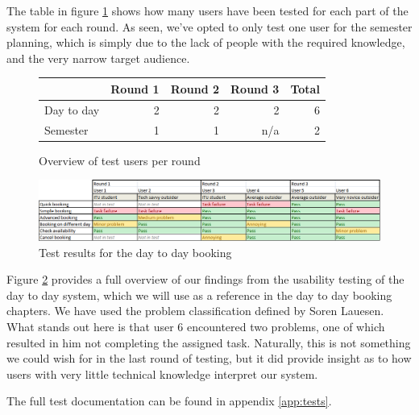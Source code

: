 The table in figure \ref{fig:usa_users} shows how many users have been tested for each part of the system for each round. As seen, we've opted to only test one user for the semester planning, which is simply due to the lack of people with the required knowledge, and the very narrow target audience.

\begin{figure}[htb]
\begin{center}
\leavevmode
	\begin{tabular}{|l|r|r|r||r|}
		\hline
		 & Round 1 & Round 2 & Round 3 & Total \\ \hline
		Day to day & 2 & 2 & 2 & 6\\ \hline
		Semester & 1 & 1 & n/a & 2 \\ \hline
	\end{tabular}
\end{center}
\caption{Overview of test users per round}
\label{fig:usa_users}
\end{figure}

\begin{figure}[htb]
\begin{center}
\leavevmode
\includegraphics[width=1\textwidth]{images/result_day}
\end{center}
\caption{Test results for the day to day booking}
\label{fig:results_day}
\end{figure}

Figure \ref{fig:results_day} provides a full overview of our findings from the usability testing of the day to day system, which we will use as a reference in the day to day booking chapters. We have used the problem classification defined by Soren Lauesen\cite{lauesen}.\\
What stands out here is that user 6 encountered two problems, one of which resulted in him not completing the assigned task. Naturally, this is not something we could wish for in the last round of testing, but it did provide insight as to how users with very little technical knowledge interpret our system.

The full test documentation can be found in appendix \ref{app:tests}.

